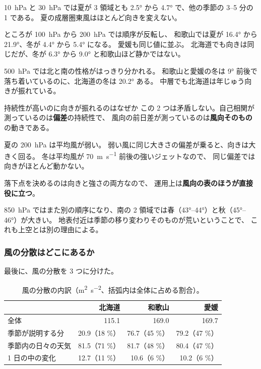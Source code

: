 \SI{10}{\hecto\pascal} と \SI{30}{\hecto\pascal} では夏が 3 領域とも
\ang{2.5} から \ang{4.7} で、他の季節の 3--5 分の 1 である。
夏の成層圏東風はほとんど向きを変えない。

ところが \SI{100}{\hecto\pascal} から \SI{200}{\hecto\pascal} では順序が反転し、
和歌山では夏が \ang{16.4} から \ang{21.9}、冬が \ang{4.4} から \ang{5.4} になる。
愛媛も同じ値に並ぶ。
北海道でも向きは同じだが、冬が \ang{6.3} から \ang{9.0} と和歌山ほど静かではない。

\SI{500}{\hecto\pascal} では北と南の性格がはっきり分かれる。
和歌山と愛媛の冬は \ang{9} 前後で落ち着いているのに、北海道の冬は \ang{20.2} ある。
中層でも北海道は年じゅう向きが振れている。

\begin{whybox}{持続性が高いのに向きが振れるのはなぜか}
この 2 つは矛盾しない。自己相関が測っているのは\textbf{偏差}の持続性で、
風向の前日差が測っているのは\textbf{風向そのもの}の動きである。

夏の \SI{200}{\hecto\pascal} は平均風が弱い。
弱い風に同じ大きさの偏差が乗ると、向きは大きく回る。
冬は平均風が \SI{70}{\metre\per\second} 前後の強いジェットなので、
同じ偏差では向きがほとんど動かない。

落下点を決めるのは向きと強さの両方なので、
運用上は\textbf{風向の表のほうが直接役に立つ}。
\end{whybox}

\SI{850}{\hecto\pascal} ではまた別の順序になり、南の 2 領域では春（\ang{43}--\ang{44}）と秋（\ang{45}--\ang{46}）が大きい。
地表付近は季節の移り変わりそのものが荒いということで、
これも上空とは別の理由による。

\subsubsection{風の分散はどこにあるか}

最後に、風の分散を 3 つに分けた。





\begin{table}[H]
\centering
\caption{風の分散の内訳（\si{\metre\squared\per\second\squared}、括弧内は全体に占める割合）。}
\label{tab:variance-split}
\begin{tabular}{@{}lrrr@{}}
\toprule
 & 北海道 & 和歌山 & 愛媛 \\
\midrule
全体 & 115.1 & 169.0 & 169.7 \\
季節が説明する分 & 20.9（18 \%） & 76.7（45 \%） & 79.2（47 \%） \\
季節内の日々の天気 & 81.5（71 \%） & 81.7（48 \%） & 80.4（47 \%） \\
1 日の中の変化 & 12.7（11 \%） & 10.6（6 \%） & 10.2（6 \%） \\
\bottomrule
\end{tabular}
\end{table}

